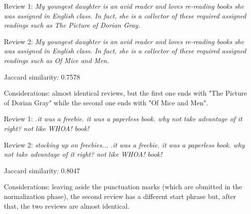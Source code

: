 \documentclass[12pt, a4paper]{article}
\begin{document}
\dotfill
\begin{itemize}
    {\fontsize{9pt}{11pt}\selectfont
    \item Review 1: \textit{My youngest daughter is an avid reader and loves re-reading books she was assigned in English class. In fact, she is a collector of these required assigned readings such as The Picture of Dorian Gray.}
    \item Review 2: \textit{My youngest daughter is an avid reader and loves re-reading books she was assigned in English class. In fact, she is a collector of these required assigned readings such as Of Mice and Men.}
    \item Jaccard similarity: 0.7578
    \item Considerations: almost identical reviews, but the first one ends with "The Picture of Dorian Gray" while the second one ends with "Of Mice and Men".
    }
\end{itemize}
\dotfill
\begin{itemize}
    {\fontsize{9pt}{11pt}\selectfont
    \item Review 1: \textit{.it was a freebie. it was a paperless book. why not take advantage of it right? not like WHOA! book!}
    \item Review 2: \textit{stocking up on freebies... .it was a freebie. it was a paperless book. why not take advantage of it right? not like WHOA! book!}
    \item Jaccard similarity: 0.8047
    \item Considerations: leaving aside the punctuation marks (which are obmitted in the normalization phase), the second review has a different start phrase but, after that, the two reviews are almost identical.
    }
\end{itemize}
\dotfill
\end{document}
